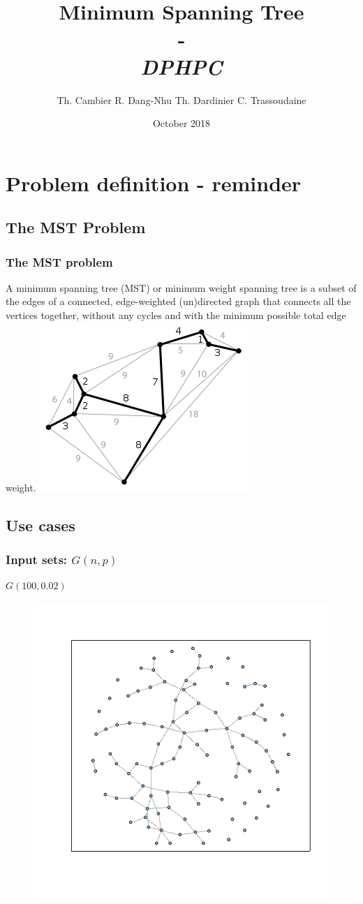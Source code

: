 \documentclass{beamer}
\institute[ETH Zürich]{\textbf{ETH Zürich}}
\date{October 2018}
\author{
    Th. Cambier
    R. Dang-Nhu
    Th. Dardinier
    C. Trassoudaine
}
\title{
	\textbf{Minimum Spanning Tree}\\
	-\\ 
	\textit{DPHPC}
}
\begin{document}

\frame{\titlepage}
\frame{\tableofcontents}



\section{Problem definition - reminder}
\subsection{The MST Problem}
\begin{frame}
\frametitle{The MST problem}
 A minimum spanning tree (MST) or minimum weight spanning tree is a subset of the edges of a connected, edge-weighted (un)directed graph that connects all the vertices together, without any cycles and with the minimum possible total edge weight. 
 \includegraphics[width=.5\textwidth]{MST.png}
\end{frame}


\subsection{Use cases}

\begin{frame}
\frametitle{Input sets: $G(n,p)$}
\centering
$G(100, 0.02)$
\begin{figure}
 \includegraphics[width=.7\textwidth]{graphGNP.png}
\end{figure}
\end{frame}
\end{document}
